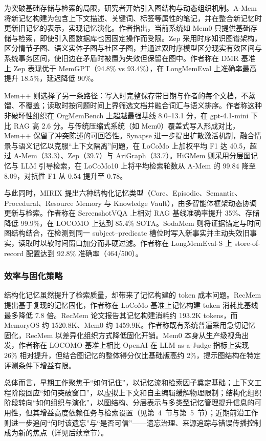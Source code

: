 为突破基础存储与检索的局限，研究者开始引入图结构与动态组织机制。A-Mem 将新记忆构建为包含上下文描述、关键词、标签等属性的笔记，并在整合新记忆时更新旧记忆的表示，实现记忆演化\cite{W0681}。作者指出，当前系统如 Mem0 只提供基础存储与检索，即使引入图数据库也因固定操作而受限\cite{W0681}。Zep 采用时序知识图谱架构，区分情节子图、语义实体子图与社区子图，并通过双时序模型区分现实有效区间与系统事务区间，使旧边在矛盾时被置为失效但保留在图中\cite{W0684}。作者称在 DMR 基准上 Zep 表现优于 MemGPT（94.8\% vs 93.4\%），在 LongMemEval 上准确率最高提升 18.5\%，延迟降低 90\%\cite{W0684}。

Mem++ 则选择了另一条路径：写入时完整保存带日期与作者的每个文档，不蒸馏、不覆盖；读取时按问题时间上界筛选文档并融合词汇与语义排序\cite{W0028}。作者称这种非破坏性组织在 OrgMemBench 上超越最强基线 8.0–13.1 分，在 gpt-4.1-mini 下比 RAG 高 2.6 分\cite{W0028}。与传统压缩式系统（如 Mem0）覆盖式写入形成对比，Mem++ 保留了冲突陈述的可回答性\cite{W0028}。Synapse 进一步提出扩散激活机制，融合情景与语义记忆以克服“上下文隔离”问题，在 LoCoMo 上加权平均 F1 达 40.5，超过 A-Mem（33.3）、Zep（39.7）与 AriGraph（33.7）\cite{W0099}。HiGMem 则采用分层图记忆与 LLM 引导检索，在 LoCoMo10 上将平均检索轮数从 A-Mem 的 99.84 降至 8.09，对抗性 F1 从 0.54 提升至 0.78\cite{W0030}。

与此同时，MIRIX 提出六种结构化记忆类型（Core、Episodic、Semantic、Procedural、Resource Memory 与 Knowledge Vault），由多智能体框架动态协调更新与检索\cite{W0105}。作者称在 ScreenshotVQA 上相对 RAG 基线准确率提升 35\%、存储降低 99.9\%，在 LOCOMO 上达到 85.4\% SOTA\cite{W0105}。SodaMem 则将证据锚定与时间图结构结合，在检测到同一 subject–predicate 槽位时写入新事实并主动失效旧事实，读取时以软时间窗口加分而非硬过滤\cite{W0222}。作者称在 LongMemEval-S 上 store-of-record 配置达到 92.8\% 准确率（464/500）\cite{W0222}。

\subsubsection{效率与固化策略}

结构化记忆虽然提升了检索质量，却带来了记忆构建的 token 成本问题。RecMem 提出基于复现的记忆固化，作者称在 LoCoMo 基准上记忆构建 token 消耗比基线最多降低 7.8 倍\cite{W0107}。RecMem 论文报告其记忆构建消耗约 193.2K tokens，而 MemoryOS 约 1520.8K、Mem0 约 1459.9K\cite{W0107}。作者称既有系统普遍采用急切记忆固化，RecMem 以差异化组织方式降低固化开销\cite{W0107}。Mem0 本身从生产级视角出发，作者称在 LOCOMO 基准上相比 OpenAI 在 LLM-as-a-Judge 指标上实现 26\% 相对提升，但结合图记忆的整体得分仅比基础版高约 2\%\cite{W0682}，提示图结构在特定评测条件下增益有限\cite{W0682}。

总体而言，早期工作聚焦于“如何记住”，以记忆流和检索因子奠定基础；上下文工程阶段回应“如何突破窗口”，以虚拟上下文和自主编辑缓解物理限制；结构化组织阶段转向“如何组织与演化”，以图结构、分层表示与多类型记忆管理提升信息的可用性，但其增益高度依赖任务与检索设置（见第~4~节与第~5~节）；近期前沿工作则进一步追问“何时该遗忘”与“是否可信”——遗忘治理、来源追踪与错误传播控制成为新的焦点（详见后续章节）。



